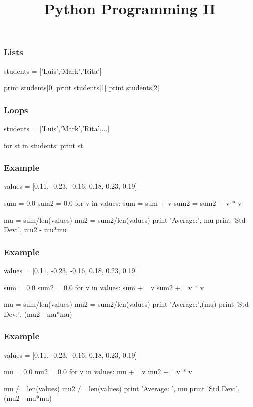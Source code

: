
\title[Python II]{Python Programming II}


\frame{\maketitle}

\begin{frame}[fragile]
\frametitle{Lists}

\begin{python}

students = ['Luis','Mark','Rita']

print students[0]
print students[1]
print students[2]
\end{python}

\end{frame}

\begin{frame}[fragile]
\frametitle{Loops}

\begin{python}
students = ['Luis','Mark','Rita',...]

for st in students:
    print st
\end{python}
\end{frame}

\begin{frame}[fragile]
\frametitle{Example}

\begin{python}
values = [0.11, -0.23, -0.16, 0.18, 0.23, 0.19]

sum = 0.0
sum2 = 0.0
for v in values:
    sum = sum + v
    sum2 = sum2 + v * v

mu = sum/len(values)
mu2 = sum2/len(values)
print 'Average:', mu
print 'Std Dev:', mu2 - mu*mu
\end{python}
\end{frame}

\begin{frame}[fragile]
\frametitle{Example}

\begin{python}
values = [0.11, -0.23, -0.16, 0.18, 0.23, 0.19]

sum = 0.0
sum2 = 0.0
for v in values:
    sum += v
    sum2 += v * v

mu = sum/len(values)
mu2 = sum2/len(values)
print 'Average:',(mu)
print 'Std Dev:', (mu2 - mu*mu)
\end{python}
\end{frame}

\begin{frame}[fragile]
\frametitle{Example}

\begin{python}
values = [0.11, -0.23, -0.16, 0.18, 0.23, 0.19]

mu = 0.0
mu2 = 0.0
for v in values:
    mu += v
    mu2 += v * v

mu /= len(values)
mu2 /= len(values)
print 'Average: ', mu
print 'Std Dev:', (mu2 - mu*mu)
\end{python}
\end{frame}

